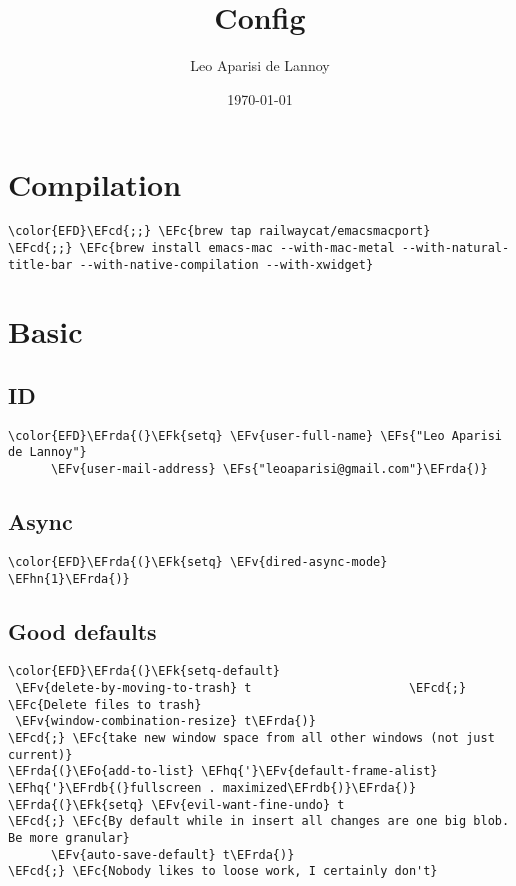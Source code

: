 \documentclass[12pt]{article}
\author{Leo Aparisi de Lannoy}
\date{\today}
\title{Config}
\theoremstyle{plain}%
\theoremstyle{definition}
\theoremstyle{remark}
\newcommand{\EFc}[1]{\textcolor{EFc}{#1}} %
\newcommand{\EFcd}[1]{\textcolor{EFcd}{#1}} %
\newcommand{\EFs}[1]{\textcolor{EFs}{#1}} %
\newcommand{\EFk}[1]{\textcolor{EFk}{#1}} %
\newcommand{\EFv}[1]{\textcolor{EFv}{#1}} %
\newcommand{\EFo}[1]{\textcolor{EFo}{#1}} %
\newcommand{\EFhn}[1]{\textcolor{EFhn}{\textbf{#1}}} %
\newcommand{\EFhq}[1]{\textcolor{EFhq}{#1}} %
\newcommand{\EFrda}[1]{\textcolor{EFrda}{#1}} %
\newcommand{\EFrdb}[1]{\textcolor{EFrdb}{#1}} %
\begin{document}
\maketitle
\tableofcontents

\section{Compilation}
\label{sec:org450e664}
\begin{Code}
\begin{Verbatim}
\color{EFD}\EFcd{;;} \EFc{brew tap railwaycat/emacsmacport}
\EFcd{;;} \EFc{brew install emacs-mac --with-mac-metal --with-natural-title-bar --with-native-compilation --with-xwidget}
\end{Verbatim}
\end{Code}
\section{Basic}
\label{sec:orgc7a61f4}
\subsection{ID}
\label{sec:org836b66b}
\begin{Code}
\begin{Verbatim}
\color{EFD}\EFrda{(}\EFk{setq} \EFv{user-full-name} \EFs{"Leo Aparisi de Lannoy"}
      \EFv{user-mail-address} \EFs{"leoaparisi@gmail.com"}\EFrda{)}
\end{Verbatim}
\end{Code}
\subsection{Async}
\label{sec:orgad33aed}
\begin{Code}
\begin{Verbatim}
\color{EFD}\EFrda{(}\EFk{setq} \EFv{dired-async-mode} \EFhn{1}\EFrda{)}
\end{Verbatim}
\end{Code}
\subsection{Good defaults}
\label{sec:org1d94803}
\begin{Code}
\begin{Verbatim}
\color{EFD}\EFrda{(}\EFk{setq-default}
 \EFv{delete-by-moving-to-trash} t                      \EFcd{;} \EFc{Delete files to trash}
 \EFv{window-combination-resize} t\EFrda{)}                      \EFcd{;} \EFc{take new window space from all other windows (not just current)}
\EFrda{(}\EFo{add-to-list} \EFhq{'}\EFv{default-frame-alist} \EFhq{'}\EFrdb{(}fullscreen . maximized\EFrdb{)}\EFrda{)}
\EFrda{(}\EFk{setq} \EFv{evil-want-fine-undo} t                       \EFcd{;} \EFc{By default while in insert all changes are one big blob. Be more granular}
      \EFv{auto-save-default} t\EFrda{)}                         \EFcd{;} \EFc{Nobody likes to loose work, I certainly don't}
\end{Verbatim}
\end{Code}
\end{document}
